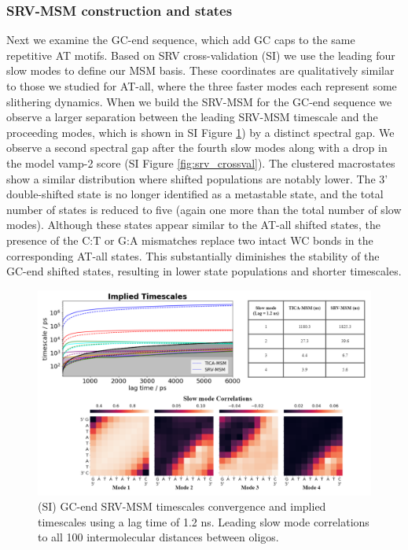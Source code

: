 \documentclass[journal=jpcbfk,manuscript=article]{achemso}
\begin{document}
\subsubsection{SRV-MSM construction and states}
	
Next we examine the GC-end sequence, which add GC caps to the same repetitive AT motifs. Based on SRV cross-validation (SI) we use the leading four slow modes to define our MSM basis.  These coordinates are qualitatively similar to those we studied for AT-all, where the three faster modes each represent some slithering dynamics. When we build the SRV-MSM for the GC-end sequence we observe a larger separation between the leading SRV-MSM timescale and the proceeding modes, which is shown in SI Figure \ref{fig:GC-end_dynamic}) by a distinct spectral gap. We observe a second spectral gap after the fourth slow modes along with a drop in the model vamp-2 score (SI Figure \ref{fig:srv_crossval}). The clustered macrostates show a similar distribution where shifted populations are notably lower. The 3' double-shifted state is no longer identified as a metastable state, and the total number of states is reduced to five (again one more than the total number of slow modes). Although these states appear similar to the AT-all shifted states, the presence of the C:T or G:A mismatches replace two intact WC bonds in the corresponding AT-all states. This substantially diminishes the stability of the GC-end shifted states, resulting in lower state populations and shorter timescales.

\begin{figure}[ht!]
	\begin{center}
        \includegraphics[width=\textwidth]{Figs/figs_0804/GC-end_dynamic.png}
        \caption{(SI) GC-end SRV-MSM timescales convergence and implied timescales using a lag time of 1.2 ns. Leading slow mode correlations to all 100 intermolecular distances between oligos.}
        \label{fig:GC-end_dynamic}
	\end{center}
\end{figure}
\end{document}
